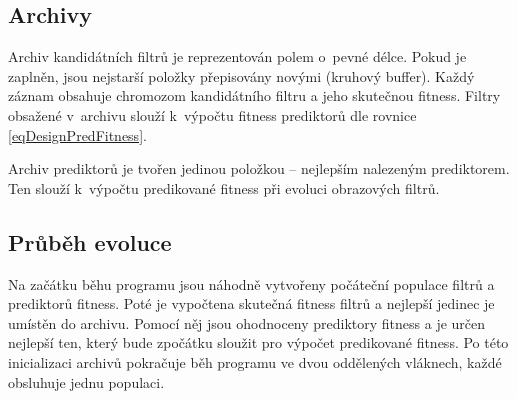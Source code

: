 



\subsection{Archivy}

Archiv kandidátních filtrů je reprezentován polem o~pevné délce. Pokud je zaplněn, jsou nejstarší položky přepisovány novými (kruhový buffer). Každý záznam obsahuje chromozom kandidátního filtru a jeho skutečnou fitness. Filtry obsažené v~archivu slouží k~výpočtu fitness prediktorů dle rovnice \ref{eqDesignPredFitness}.

Archiv prediktorů je tvořen jedinou položkou -- nejlepším nalezeným prediktorem. Ten slouží k~výpočtu predikované fitness při evoluci obrazových filtrů.

\subsection{Průběh evoluce}

Na začátku běhu programu jsou náhodně vytvořeny počáteční populace filtrů a prediktorů fitness. Poté je vypočtena skutečná fitness filtrů a nejlepší jedinec je umístěn do archivu. Pomocí něj jsou ohodnoceny prediktory fitness a je určen nejlepší ten, který bude zpočátku sloužit pro výpočet predikované fitness. Po této inicializaci archivů pokračuje běh programu ve dvou oddělených vláknech, každé obsluhuje jednu populaci.

